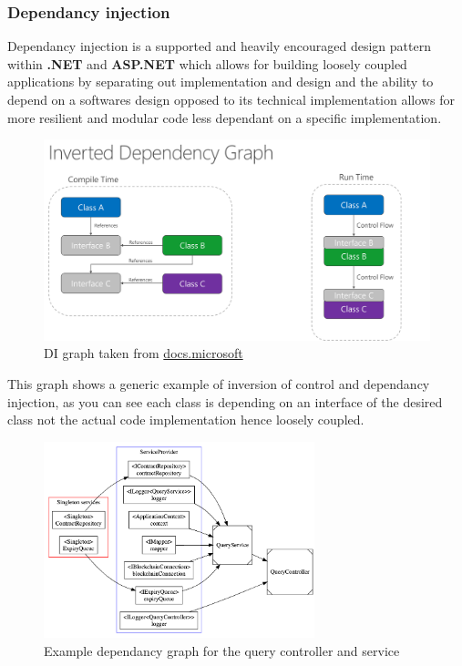 \subsubsection{Dependancy injection}

Dependancy injection is a supported and heavily encouraged design pattern within \textbf{.NET} and \textbf{ASP.NET} which allows for building loosely coupled applications by separating out implementation and design and the ability to depend on a softwares design opposed to its technical implementation allows for more resilient and modular code less dependant on a specific implementation.

\begin{figure}[H]
\caption{DI graph taken from \href{https://docs.microsoft.com/en-us/dotnet/architecture/modern-web-apps-azure/architectural-principles#dependency-inversion}{docs.microsoft}}
\centering
\includegraphics[width=\textwidth,height=\textheight,keepaspectratio]{images/patterns/ms-di}
\centering
\end{figure}

This graph shows a generic example of inversion of control and dependancy injection, as you can see each class is depending on an interface of the desired class not the actual code implementation hence loosely coupled.

\begin{figure}[H]
\caption{Example dependancy graph for the query controller and service}
\centering
\includegraphics[width=0.7\textwidth,height=0.7\textheight,keepaspectratio]{images/patterns/DI-example}
\end{figure}


